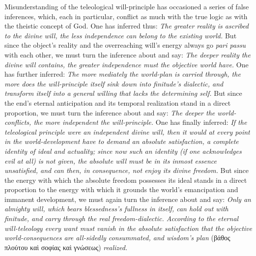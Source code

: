 \documentclass[12pt]{book}
\begin{document}
Misunderstanding of the teleological will-principle has occasioned a series
of false inferences, which, each in particular, conflict as much with the
true logic as with the theistic concept of God. One has inferred thus:
\emph{The greater reality is ascribed to the divine will, the less
independence can belong to the existing world.} But since the object's
reality and the overreaching will's energy always go \textit{pari passu}
with each other, we must turn the inference about and say: \emph{The deeper
reality the divine will contains, the greater independence must the
objective world have.} One has further inferred: \emph{The more mediately
the world-plan is carried through, the more does the will-principle itself
sink down into finitude's dialectic, and transform itself into a general
willing that lacks the determining self.} But since the end's eternal
anticipation and its temporal realization stand in a direct proportion, we
must turn the inference about and say: \emph{The deeper the
world-conflicts, the more independent the will-principle.} One has finally
inferred: \emph{If the teleological principle were an independent divine
will, then it would at every point in the world-development have to demand
an absolute satisfaction, a complete identity of ideal and actuality; since
now such an identity (if one acknowledges evil at all) is not given, the
absolute will must be in its inmost essence unsatisfied, and can then, in
consequence, not enjoy its divine freedom.} But since the energy with which
the absolute freedom possesses its ideal stands in a direct proportion to
the energy with which it grounds the world's emancipation and immanent
development, we must again turn the inference about and say: \emph{Only an
almighty will, which bears blessedness's fullness in itself, can hold out
with finitude, and carry through the real freedom-dialectic. According to
the eternal will-teleology every want must vanish in the absolute
satisfaction that the objective world-consequences are all-sidedly
consummated, and wisdom's plan} (βάθος πλούτου καὶ σοφίας καὶ γνώσεως)
\emph{realized.}
\end{document}
